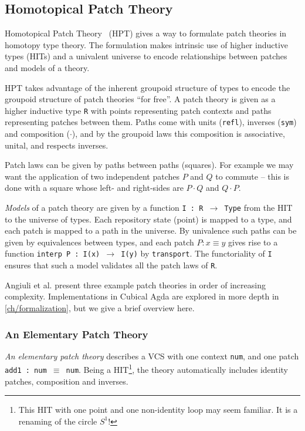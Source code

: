 \subsection{Homotopical Patch Theory}\label{subsec:hpt}

Homotopical Patch Theory~\cite{Angiuli2016} (HPT) gives a way to formulate patch
theories in homotopy type theory. The formulation makes intrinsic use of higher
inductive types (HITs) and a univalent universe to encode relationships between
patches and models of a theory.

HPT takes advantage of the inherent groupoid structure of types to encode the
groupoid structure of patch theories ``for free''. A patch theory is given as a
higher inductive type \texttt{R} with points representing patch contexts and
paths representing patches between them. Paths come with units (\texttt{refl}),
inverses (\texttt{sym}) and composition (\texttt{$\cdot$}),
and by the groupoid laws this composition is associative, unital, and respects
inverses.

Patch laws can be given by paths between paths (squares). For example we may
want the application of two independent patches $P$ and $Q$ to commute -- this is done with
a square whose left- and right-sides are $P \cdot Q$ and $Q \cdot P$.

\emph{Models} of a patch theory are given by a function \texttt{I : R
  $\rightarrow$ Type} from the HIT to the universe of types. Each repository
state (point) is mapped to a type, and each patch is mapped to a path in the
universe. By univalence such paths can be given by equivalences between types,
and each patch $P : x \equiv y$ gives rise to a function \texttt{interp P : I(x)
$\rightarrow$ I(y)} by \texttt{transport}. The functoriality of \texttt{I}
ensures that such a model validates all the patch laws of \texttt{R}.

Angiuli et al. present three example patch theories in order of increasing
complexity. Implementations in Cubical Agda are explored in more depth in
\autoref{ch/formalization}, but we give a brief overview here.

\subsubsection{An Elementary Patch Theory}

\emph{An elementary patch theory} describes a VCS with one context \texttt{num}, and
one patch \texttt{add1~:~num~$\equiv$~num}. Being a HIT\footnote{This HIT with one point and
one non-identity loop may seem familiar. It is a renaming of the circle $S^1$!},
the theory automatically includes identity patches, composition and inverses.

